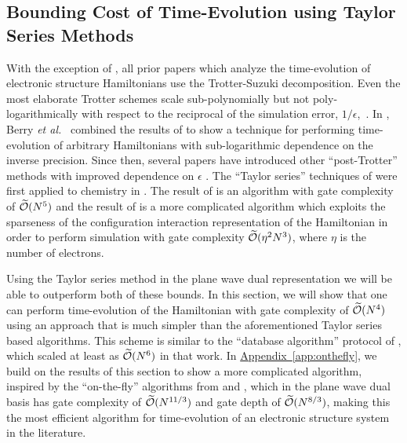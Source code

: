 \documentclass[superscriptaddress,aps,pra,nofootinbib,notitlepage,10pt,longbibliography]{revtex4-1}
\DeclareRobustCommand{\app}[1]{\hyperref[app:#1]{Appendix~\ref*{app:#1}}}
\begin{document}
\subsection{Bounding Cost of Time-Evolution using Taylor Series Methods}
\label{sec:taylor_alg}

With the exception of \cite{BabbushSparse1,BabbushSparse2,Kivlichan2016,Low2016,BabbushSymmetry}, all prior papers which analyze the time-evolution of electronic structure Hamiltonians use the Trotter-Suzuki decomposition. Even the most elaborate Trotter schemes scale sub-polynomially but not poly-logarithmically with respect to the reciprocal of the simulation error, $1/\epsilon$,~\cite{Berry2007,Wiebe2008}. In \cite{Berry2013,Berry2015}, Berry \emph{et al.}~ combined the results of \cite{Berry2007,Cleve2009,Berry2014} to show a technique for performing time-evolution of arbitrary Hamiltonians with sub-logarithmic dependence on the inverse precision. Since then, several papers have introduced other ``post-Trotter'' methods with improved dependence on $\epsilon$ \cite{Low2017,Novo2016}. The ``Taylor series'' techniques of \cite{Berry2013} were first applied to chemistry in \cite{BabbushSparse1,BabbushSparse2}. The result of \cite{BabbushSparse1} is an algorithm with gate complexity of $\widetilde{\cal O}(N^5)$ and the result of \cite{BabbushSparse2} is a more complicated algorithm which exploits the sparseness of the configuration interaction representation of the Hamiltonian in order to perform simulation with gate complexity $\widetilde{\cal O}(\eta^2 N^3)$, where $\eta$ is the number of electrons.

Using the Taylor series method in the plane wave dual representation we will be able to outperform both of these bounds. In this section, we will show that one can perform time-evolution of the Hamiltonian with gate complexity of $\widetilde{\cal O}(N^4)$ using an approach that is much simpler than the aforementioned Taylor series based algorithms. This scheme is similar to the ``database algorithm'' protocol of \cite{BabbushSparse1}, which scaled at least as $\widetilde{\cal O}(N^6)$ in that work. In \app{onthefly}, we build on the results of this section to show a more complicated algorithm, inspired by the ``on-the-fly'' algorithms from \cite{BabbushSparse1} and \cite{BabbushSparse2}, which in the plane wave dual basis has gate complexity of $\widetilde{\cal O}(N^{11/3})$ and gate depth of $\widetilde{\cal O}(N^{8/3})$, making this the most efficient algorithm for time-evolution of an electronic structure system in the literature.
\end{document}
